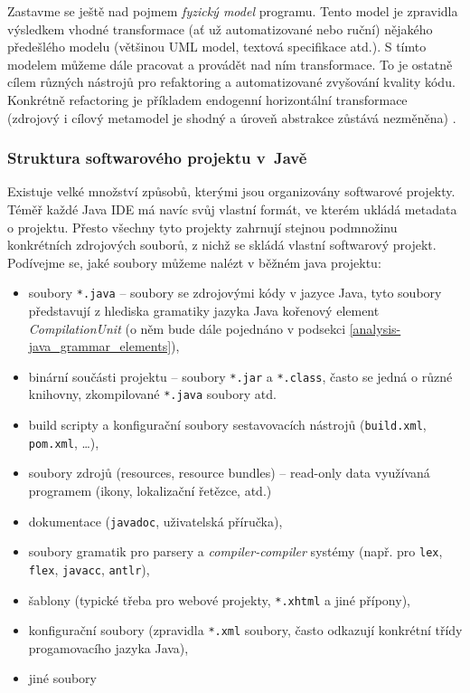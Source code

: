 Zastavme se ještě nad pojmem \emph{fyzický model} programu. Tento model je zpravidla výsledkem vhodné transformace (ať už automatizované nebo ruční) nějakého předešlého modelu (většinou UML model, textová specifikace atd.). S tímto modelem můžeme dále pracovat a provádět nad ním transformace. To je ostatně cílem různých nástrojů pro refaktoring a automatizované zvyšování kvality kódu. Konkrétně refactoring je příkladem endogenní horizontální transformace (zdrojový i cílový metamodel je shodný a úroveň abstrakce zůstává nezměněna) \cite{Mens05ataxonomy}.

\subsubsection{Struktura softwarového projektu v~Javě}
Existuje velké množství způsobů, kterými jsou organizovány softwarové projekty. Téměř každé Java IDE má navíc svůj vlastní formát, ve kterém ukládá metadata o projektu. Přesto všechny tyto projekty zahrnují stejnou podmnožinu konkrétních zdrojových souborů, z nichž se skládá vlastní softwarový projekt. Podívejme se, jaké soubory můžeme nalézt v běžném java projektu:

\begin{itemize}
\item soubory \verb+*.java+ -- soubory se zdrojovými kódy v jazyce Java, tyto soubory představují z hlediska gramatiky jazyka Java kořenový element \emph{CompilationUnit} (o něm bude dále pojednáno v podsekci \ref{analysis-java_grammar_elements}),
\item binární součásti projektu -- soubory \verb+*.jar+ a \verb+*.class+, často se jedná o různé knihovny, zkompilované \verb+*.java+ soubory atd.
\item build scripty a konfigurační soubory sestavovacích nástrojů (\verb+build.xml+, \verb+pom.xml+, \ldots),
\item soubory zdrojů (resources, resource bundles) -- read-only data využívaná programem (ikony, lokalizační řetězce, atd.)
\item dokumentace (\verb+javadoc+, uživatelská příručka),
\item soubory gramatik pro parsery a \emph{compiler-compiler} systémy (např. pro \verb+lex+, \verb+flex+, \verb+javacc+, \verb+antlr+),
\item šablony (typické třeba pro webové projekty, \verb+*.xhtml+ a jiné přípony),
\item konfigurační soubory (zpravidla \verb+*.xml+ soubory, často odkazují konkrétní třídy progamovacího jazyka Java),
\item jiné soubory
\end{itemize}


